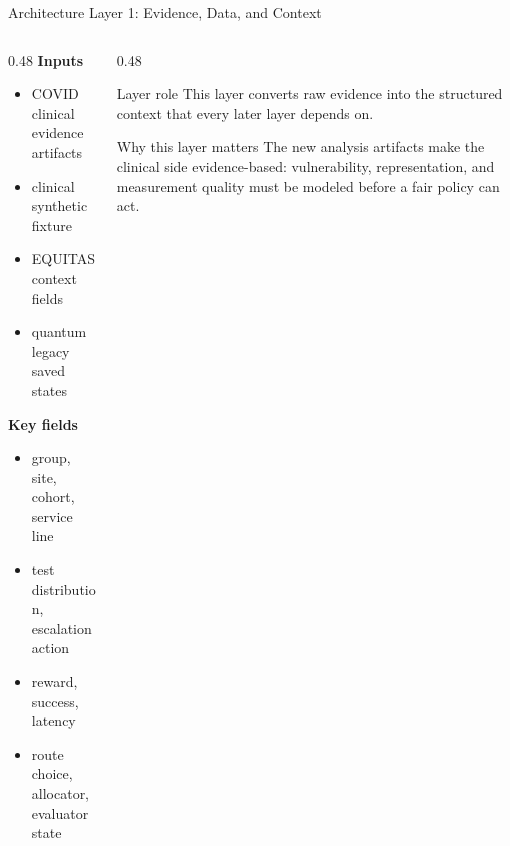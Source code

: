 \documentclass[aspectratio=169,10pt]{beamer}
\begin{document}
\begin{frame}{Architecture Layer 1: Evidence, Data, and Context}
\begin{columns}[T]
\begin{column}{0.48\textwidth}
\textbf{Inputs}
\begin{itemize}
    \item COVID clinical evidence artifacts
    \item clinical synthetic fixture
    \item EQUITAS context fields
    \item quantum legacy saved states
\end{itemize}

\textbf{Key fields}
\begin{itemize}
    \item group, site, cohort, service line
    \item test distribution, escalation action
    \item reward, success, latency
    \item route choice, allocator, evaluator state
\end{itemize}
\end{column}
\begin{column}{0.48\textwidth}
\begin{block}{Layer role}
This layer converts raw evidence into the structured context that every later layer depends on.
\end{block}
\begin{block}{Why this layer matters}
The new analysis artifacts make the clinical side evidence-based: vulnerability, representation, and measurement quality must be modeled before a fair policy can act.
\end{block}
\end{column}
\end{columns}
\end{frame}
\end{document}
